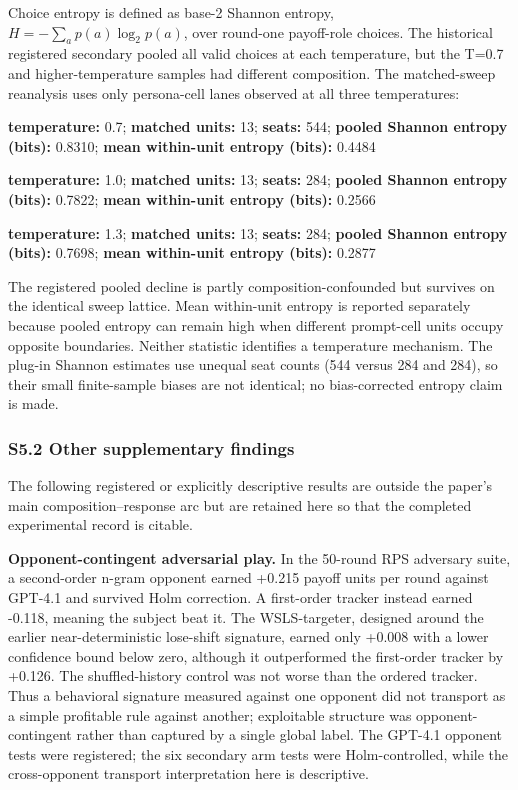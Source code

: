 \documentclass[11pt]{article}
\begin{document}
Choice entropy is defined as base-2 Shannon entropy,
\(H=-\sum_a p(a)\log_2p(a)\), over round-one payoff-role choices. The
historical registered secondary pooled all valid choices at each
temperature, but the T=0.7 and higher-temperature samples had different
composition. The matched-sweep reanalysis uses only persona-cell lanes
observed at all three temperatures:

\textbf{temperature:} 0.7; \textbf{matched units:} 13; \textbf{seats:}
544; \textbf{pooled Shannon entropy (bits):} 0.8310; \textbf{mean
within-unit entropy (bits):} 0.4484

\textbf{temperature:} 1.0; \textbf{matched units:} 13; \textbf{seats:}
284; \textbf{pooled Shannon entropy (bits):} 0.7822; \textbf{mean
within-unit entropy (bits):} 0.2566

\textbf{temperature:} 1.3; \textbf{matched units:} 13; \textbf{seats:}
284; \textbf{pooled Shannon entropy (bits):} 0.7698; \textbf{mean
within-unit entropy (bits):} 0.2877

The registered pooled decline is partly composition-confounded but
survives on the identical sweep lattice. Mean within-unit entropy is
reported separately because pooled entropy can remain high when
different prompt-cell units occupy opposite boundaries. Neither
statistic identifies a temperature mechanism. The plug-in Shannon
estimates use unequal seat counts (544 versus 284 and 284), so their
small finite-sample biases are not identical; no bias-corrected entropy
claim is made.

\subsubsection{S5.2 Other supplementary
findings}\label{s5.2-other-supplementary-findings}

The following registered or explicitly descriptive results are outside
the paper's main composition--response arc but are retained here so that
the completed experimental record is citable.

\textbf{Opponent-contingent adversarial play.} In the 50-round RPS
adversary suite, a second-order n-gram opponent earned +0.215 payoff
units per round against GPT-4.1 and survived Holm correction. A
first-order tracker instead earned -0.118, meaning the subject beat it.
The WSLS-targeter, designed around the earlier near-deterministic
lose-shift signature, earned only +0.008 with a lower confidence bound
below zero, although it outperformed the first-order tracker by +0.126.
The shuffled-history control was not worse than the ordered tracker.
Thus a behavioral signature measured against one opponent did not
transport as a simple profitable rule against another; exploitable
structure was opponent-contingent rather than captured by a single
global label. The GPT-4.1 opponent tests were registered; the six
secondary arm tests were Holm-controlled, while the cross-opponent
transport interpretation here is descriptive.
\end{document}
